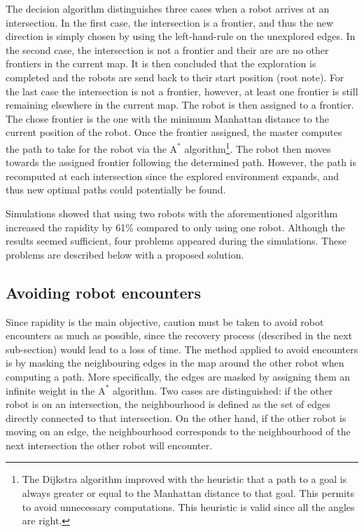 \documentclass[12pt]{report}
\begin{document}
The decision algorithm distinguishes three cases when a robot arrives at an intersection. In the first case, the intersection is a frontier, and thus the new direction is simply chosen by using the left-hand-rule on the unexplored edges. In the second case, the intersection is not a frontier and their are are no other frontiers in the current map. It is then concluded that the exploration is completed and the robots are send back to their start position (root note). For the last case the intersection is not a frontier, however, at least one frontier is still remaining elsewhere in the current map. The robot is then assigned to a frontier. The chose frontier is the one with the minimum Manhattan distance to the current position of the robot. Once the frontier assigned, the master computes the path to take for the robot via the $\text{A}^*$ algorithm\footnote{The Dijkstra algorithm improved with the heuristic that a path to a goal is always greater or equal to the Manhattan distance to that goal. This permits to avoid unnecessary computations. This heuristic is valid since all the angles are right.}. The robot then moves towards the assigned frontier following the determined path. However, the path is recomputed at each intersection since the explored environment expands, and thus new optimal paths could potentially be found.
 
Simulations showed that using two robots with the aforementioned algorithm increased the rapidity by 61\% compared to only using one robot. Although the results seemed sufficient, four problems appeared during the simulations. These problems are described below with a proposed solution. 

\subsection*{Avoiding robot encounters}
Since rapidity is the main objective, caution must be taken to avoid robot encounters as much as possible, since the recovery process (described in the next sub-section) would lead to a loss of time. The method applied to avoid encounters is by masking the neighbouring edges in the map around the other robot when computing a path. More specifically, the edges are masked by assigning them an infinite weight in the $\text{A}^*$ algorithm. Two cases are distinguished: if the other robot is on an intersection, the neighbourhood is defined as the set of edges directly connected to that intersection. On the other hand, if the other robot is moving on an edge, the neighbourhood corresponds to the neighbourhood of the next intersection the other robot will encounter. 
\end{document}
